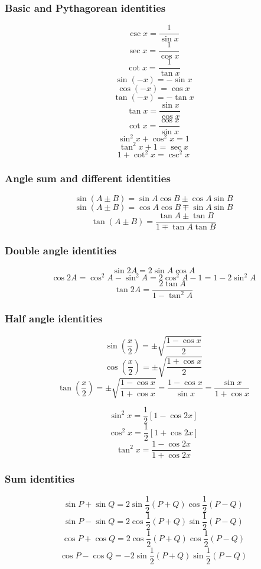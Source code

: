 \documentclass[11pt]{article}
\begin{document}
\subsubsection{Basic and Pythagorean identities}
\label{sec:orgac640d9}
\[\csc x = \frac{1}{\sin x}\]
\[\sec x = \frac{1}{\cos x}\]
\[\cot x = \frac{1}{\tan x}\]
\[\sin (-x) = - \sin x\]
\[\cos (-x) = \cos x\]
\[\tan (-x) = - \tan x\]
\[\tan x = \frac{\sin x}{\cos x}\]
\[\cot x = \frac{\cos x}{\sin x}\]
\[\sin^2 x + \cos^2 x = 1\]
\[\tan^2 x + 1 = \sec x\]
\[1 + \cot^2 x = \csc^2 x\]

\subsubsection{Angle sum and different identities}
\label{sec:org83f4a2f}
\[\sin(A \pm B) = \sin A \cos B \pm \cos A \sin B\]
\[\sin(A \pm B) = \cos A \cos B \mp \sin A \sin B\]
\[\tan(A \pm B) = \frac{\tan A \pm \tan B}{1 \mp \tan A \tan B}\]

\subsubsection{Double angle identities}
\label{sec:org06c4b57}
\[\sin 2A = 2 \sin A \cos A\]
\[\cos 2A = \cos^2 A - \sin^2 A = 2 \cos^2 A - 1 = 1 - 2 \sin^2 A\]
\[\tan 2A = \frac{2 \tan A}{1 - \tan^2 A}\]

\subsubsection{Half angle identities}
\label{sec:org21b9ffe}
\[\sin \left(\frac{x}{2} \right) = \pm \sqrt{\frac{1 - \cos x}{2}}\]
\[\cos \left(\frac{x}{2} \right) = \pm \sqrt{\frac{1 + \cos x}{2}}\]
\[\tan \left(\frac{x}{2} \right) = \pm \sqrt{\frac{1 - \cos x}{1 + \cos x}} = \frac{1 - \cos x}{\sin x} = \frac{\sin x}{1 + \cos x}\]

\[\sin^2 x = \frac{1}{2} \left[1 - \cos 2x \right]\]
\[\cos^2 x = \frac{1}{2} \left[1 + \cos 2x \right]\]
\[\tan^2 x = \frac{1 - \cos 2x}{1 + \cos 2x}\]

\subsubsection{Sum identities}
\label{sec:orge67b891}
\[\sin P + \sin Q = 2 \sin \frac{1}{2}(P + Q) \cos \frac{1}{2}(P - Q)\]
\[\sin P - \sin Q = 2 \cos \frac{1}{2}(P + Q) \sin \frac{1}{2}(P - Q)\]
\[\cos P + \cos Q = 2 \cos \frac{1}{2}(P + Q) \cos \frac{1}{2}(P - Q)\]
\[\cos P - \cos Q = - 2 \sin \frac{1}{2}(P + Q) \sin \frac{1}{2}(P - Q)\]
\end{document}
